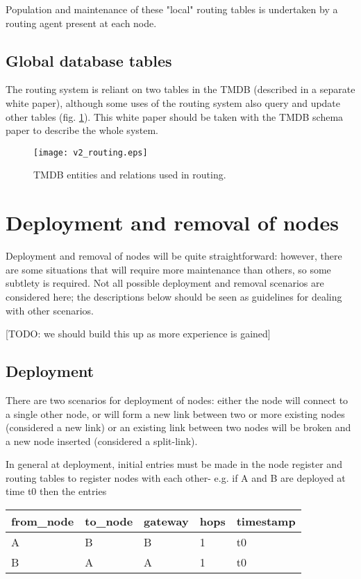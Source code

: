 \documentclass{cmspaper}
\begin{document}
Population and maintenance of these "local" routing tables is undertaken by a routing agent present at each node.

\subsection{Global database tables}
The routing system is reliant on two tables in the TMDB (described in a separate white paper), although some uses of the routing system also query and update other tables (fig. \ref{fig:schema}). This white paper should be taken with the TMDB schema paper to describe the whole system.

\begin{figure}[htb]
\centering
\texttt{[image: v2\_routing.eps]}
\caption{TMDB entities and relations used in routing.}
\label{fig:schema}
\end{figure}

\section{Deployment and removal of nodes}
Deployment and removal of nodes will be quite straightforward: however, there are some situations that will require more maintenance than others, so some subtlety is required. Not all possible deployment and removal scenarios are considered here; the descriptions below should be seen as guidelines for dealing with other scenarios.

[TODO: we should build this up as more experience is gained]

\subsection{Deployment}
There are two scenarios for deployment of nodes: either the node will connect to a single other node, or will form a new link between two or more existing nodes (considered a new link) or an existing link between two nodes will be broken and a new node inserted (considered a split-link).

In general at deployment, initial entries must be made in the node register and routing tables to register nodes with each other- e.g. if A and B are deployed at time t0 then the entries

\begin{tabular}{lllll}
from\_node	& to\_node	& gateway	& hops	& timestamp	
\\ \hline A	& B	& B	& 1	& t0
\\ B	& A	& A	& 1	& t0
\end{tabular}
\end{document}
